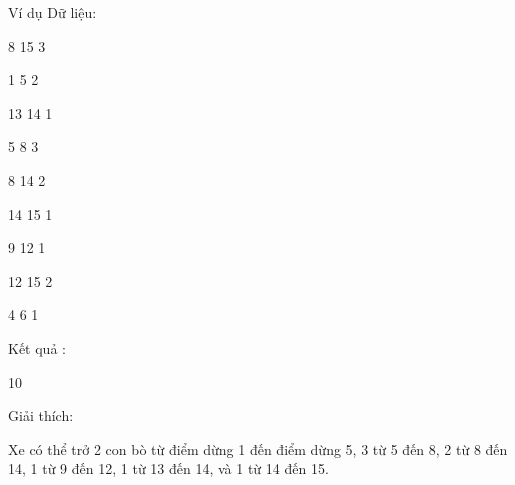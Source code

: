 Ví dụ
Dữ liệu:  

   8 15 3   


   1 5 2   


   13 14 1   


   5 8 3   


   8 14 2   


   14 15 1   


   9 12 1   


   12 15 2   


   4 6 1  

   Kết quả :  

   10  

   Giải thích:  

   Xe có thể trở 2 con bò từ điểm dừng 1 đến điểm dừng 5, 3 từ 5 đến 8, 2 từ 8 đến 14, 1 từ 9 đến 12, 1 từ 13 đến 14, và 1 từ 14 đến 15.